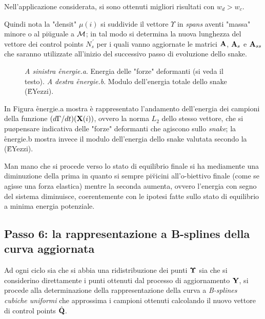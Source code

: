 \boss
Nell'applicazione considerata, si sono ottenuti migliori risultati con $w_d > w_c$.
\eoss

Quindi nota la "densit\a" $\mu(i)$ si suddivide il vettore $\Upsilon$ in {\it spans} aventi
"massa" minore o al pi\u uguale a ${\cal M}$; in tal modo si determina la nuova
lunghezza del vettore dei control points $N_s^{\,\prime}$ per i quali vanno aggiornate le
matrici ${\bf A}$, ${\bf A}_s$ e ${\bf A}_{ss}$ che saranno utilizzate all'inizio del successivo
passo di evoluzione dello snake.

\begin{figure}[tbp]
 \centerline{
   \hfill
  }
   \caption[Energie dello snake]
    {{\sl A sinistra \r{energie}.a}. Energia delle "forze" deformanti (si veda il testo).
     {\sl A destra \r{energie}.b}. Modulo dell'energia totale dello snake (\r{EYezzi}).}
\end{figure}

In Figura \r{energie}.a mostra è rappresentato l'andamento dell'energia dei
campioni della funzione $(d \Gamma / dt)({\bf X}(i))$, ovvero la norma $L_2$ dello stesso vettore,
che si pu\o pensare indicativa delle "forze" deformanti che agiscono sullo {\it snake};
la \r{energie}.b mostra invece il modulo dell'energia dello snake valutata secondo la
(\r{EYezzi}).

Man mano che si procede verso lo stato di equilibrio finale si ha mediamente una diminuzione
della prima in quanto si \e sempre pi\u vicini all'o-biettivo finale (come se agisse una forza
elastica) mentre la seconda aumenta, ovvero l'energia con segno del sistema diminuisce,
coerentemente con le ipotesi fatte sullo stato di equilibrio a minima energia potenziale.

\subsection{Passo 6: la rappresentazione a B-splines della curva aggiornata}

Ad ogni ciclo sia che si abbia una ridistribuzione dei punti ${\bf \Upsilon}$ sia che si
considerino direttamente i punti ottenuti dal processo di aggiornamento $\bf Y$, si procede
alla determinazione della rappresentazione della curva a {\it B-splines 
cubiche uniformi} che approssima i campioni ottenuti calcolando il nuovo vettore di control points $\hat{\bf Q}$.

